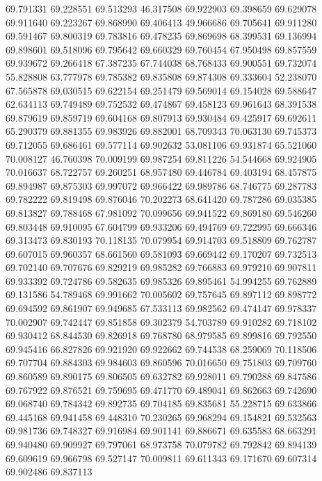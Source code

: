69.791331
69.228551
69.513293
46.317508
69.922903
69.398659
69.629078
69.911640
69.223267
69.868990
69.406413
49.966686
69.705641
69.911280
69.591467
69.800319
69.783816
69.478235
69.869698
68.399531
69.136994
69.898601
69.518096
69.795642
69.660329
69.760454
67.950498
69.857559
69.939672
69.266418
67.387235
67.744038
68.768433
69.900551
69.732074
55.828808
63.777978
69.785382
69.835808
69.874308
69.333604
52.238070
67.565878
69.030515
69.622154
69.251479
69.569014
69.154028
69.588647
62.634113
69.749489
69.752532
69.474867
69.458123
69.961643
68.391538
69.879619
69.859719
69.604168
69.807913
69.930484
69.425917
69.692611
65.290379
69.881355
69.983926
69.882001
68.709343
70.063130
69.745373
69.712055
69.686461
69.577114
69.902632
53.081106
69.931874
65.521060
70.008127
46.760398
70.009199
69.987254
69.811226
54.544668
69.924905
70.016637
68.722757
69.260251
68.957480
69.446784
69.403194
68.457875
69.894987
69.875303
69.997072
69.966422
69.989786
68.746775
69.287783
69.782222
69.819498
69.876046
70.202273
68.641420
69.787286
69.035385
69.813827
69.788468
67.981092
70.099656
69.941522
69.869180
69.546260
69.803448
69.910095
67.604799
69.933206
69.494769
69.722995
69.666346
69.313473
69.830193
70.118135
70.079954
69.914703
69.518809
69.762787
69.607015
69.960357
68.661560
69.581093
69.669442
69.170207
69.732513
69.702140
69.707676
69.829219
69.985282
69.766883
69.979210
69.907811
69.933392
69.724786
69.582635
69.985326
69.895461
54.994255
69.762889
69.131586
54.789468
69.991662
70.005602
69.757645
69.897112
69.898772
69.694592
69.861907
69.949685
67.533113
69.982562
69.474147
69.978337
70.002907
69.742447
69.851858
69.302379
54.703789
69.910282
69.718102
69.930412
68.844530
69.826918
69.768780
68.979585
69.899816
69.792550
69.945416
66.827826
69.921920
69.922662
69.744538
68.259069
70.118506
69.707704
69.884303
69.984603
69.860596
70.016650
69.751803
69.709760
69.860589
69.890175
69.806505
69.632782
69.928011
69.790288
69.847586
69.767922
69.876521
69.759695
69.471770
69.489041
69.862663
69.742690
69.068740
69.784342
69.892735
69.704185
69.835681
55.228715
69.633866
69.445168
69.941458
69.448310
70.230265
69.968294
69.154821
69.532563
69.981736
69.748327
69.916984
69.901141
69.886671
69.635583
68.663291
69.940480
69.909927
69.797061
68.973758
70.079782
69.792842
69.894139
69.609619
69.966798
69.527147
70.009811
69.611343
69.171670
69.607314
69.902486
69.837113

